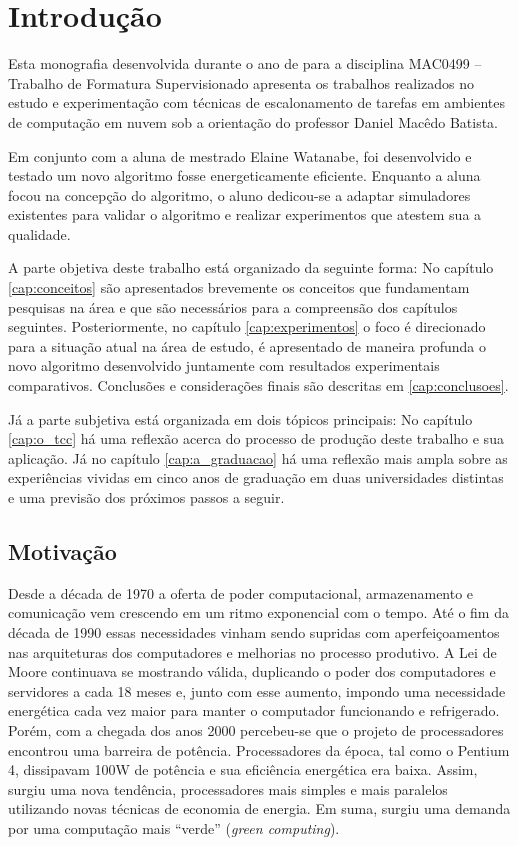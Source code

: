 \chapter{Introdução}
\label{cap:introducao}
Esta monografia desenvolvida durante o ano de  para a disciplina MAC0499 --
Trabalho de Formatura Supervisionado apresenta os trabalhos realizados no estudo
e experimentação com técnicas de escalonamento de tarefas em ambientes de 
computação em nuvem sob a orientação do professor Daniel Macêdo Batista.

Em conjunto com a aluna de mestrado Elaine Watanabe, foi desenvolvido e testado
um novo algoritmo fosse energeticamente eficiente. Enquanto a aluna focou na
concepção do algoritmo, o aluno dedicou-se a adaptar simuladores existentes para
validar o algoritmo e realizar experimentos que atestem sua a qualidade.

A parte objetiva deste trabalho está organizado da seguinte forma: No capítulo
\ref{cap:conceitos} são apresentados brevemente os conceitos que fundamentam
pesquisas na área e que são necessários para a compreensão dos capítulos
seguintes. Posteriormente, no capítulo \ref{cap:experimentos} o foco é
direcionado para a situação atual na área de estudo, é apresentado de maneira
profunda o novo algoritmo desenvolvido juntamente com resultados experimentais
comparativos. Conclusões e considerações finais são descritas em
\ref{cap:conclusoes}.

Já a parte subjetiva está organizada em dois tópicos principais: No capítulo 
\ref{cap:o_tcc} há uma reflexão acerca do processo de produção deste trabalho
e sua aplicação. Já no capítulo \ref{cap:a_graduacao} há uma reflexão mais ampla
sobre as experiências vividas em cinco anos de graduação em duas universidades
distintas e uma previsão dos próximos passos a seguir.


\section{Motivação}
\label{sec:motivacao}
Desde a década de 1970 a oferta de poder computacional, armazenamento e
comunicação vem crescendo em um ritmo exponencial com o tempo. Até o fim da
década de 1990 essas necessidades vinham sendo supridas com aperfeiçoamentos nas
arquiteturas dos computadores e melhorias no processo produtivo. A Lei de Moore
continuava se mostrando válida, duplicando o poder dos computadores e servidores
a cada 18 meses e, junto com esse aumento, impondo uma necessidade energética
cada vez maior para manter o computador funcionando e refrigerado. Porém, com a
chegada dos anos 2000 percebeu-se que o projeto de processadores encontrou uma
barreira de potência. Processadores da época, tal como o Pentium 4, dissipavam
100W de potência e sua eficiência energética era baixa. \cite{patterson:computer_organization}
Assim, surgiu uma nova tendência, processadores mais simples e mais paralelos
utilizando novas técnicas de economia de energia. Em suma, surgiu uma demanda
por uma computação mais ``verde'' (\emph{green computing}).

